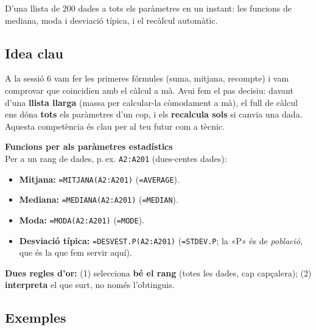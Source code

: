 %
{D'una llista de 200 dades a tots els paràmetres en un instant: les funcions de mediana, moda i desviació típica, i el recàlcul automàtic.}

\subsection{Idea clau}

A la sessió 6 vam fer les primeres fórmules (suma, mitjana, recompte) i vam comprovar
que coincidien amb el càlcul a mà. Avui fem el pas decisiu: davant d'una \textbf{llista
llarga} (massa per calcular-la còmodament a mà), el full de càlcul ens dóna
\textbf{tots} els paràmetres d'un cop, i els \textbf{recalcula sols} si canvia una
dada. Aquesta competència és clau per al teu futur com a tècnic.

\begin{idea}
\textbf{Funcions per als paràmetres estadístics}\\
Per a un rang de dades, p.\,ex. \texttt{A2:A201} (dues-centes dades):
\begin{itemize}[leftmargin=1.4em, itemsep=2pt]
  \item \textbf{Mitjana:} \texttt{=MITJANA(A2:A201)} \quad (\texttt{=AVERAGE}).
  \item \textbf{Mediana:} \texttt{=MEDIANA(A2:A201)} \quad (\texttt{=MEDIAN}).
  \item \textbf{Moda:} \texttt{=MODA(A2:A201)} \quad (\texttt{=MODE}).
  \item \textbf{Desviació típica:} \texttt{=DESVEST.P(A2:A201)} \quad (\texttt{=STDEV.P};
        la «P» és de \emph{població}, que és la que fem servir aquí).
\end{itemize}
\textbf{Dues regles d'or:} (1) selecciona \textbf{bé el rang} (totes les dades, cap
capçalera); (2) \textbf{interpreta} el que surt, no només l'obtinguis.
\end{idea}

\subsection{Exemples}

